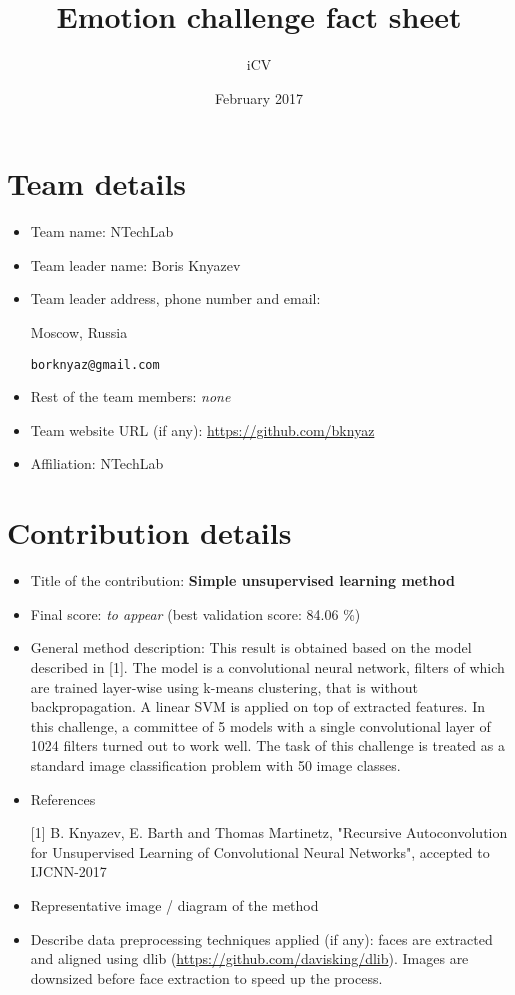 \documentclass{article}
\title{Emotion challenge fact sheet}
\author{iCV}
\date{February 2017}
\begin{document}
\maketitle

\section{Team details}

\begin{itemize}
\item Team name: NTechLab                                  
\item Team leader name: Boris Knyazev                           
\item Team leader address, phone number and email: 

Moscow, Russia

\texttt{borknyaz@gmail.com}

\item Rest of the team members: \textit{none}                    
\item Team website URL (if any): \url{https://github.com/bknyaz}
\item Affiliation: NTechLab
\end{itemize}

\section{Contribution details}

\begin{itemize}
\item Title of the contribution: \textbf{Simple unsupervised learning method}
\item Final score: \textit{to appear} (best validation score: 84.06 \%)                                             
\item General method description: This result is obtained based on the model described in [1]. 
The model is a convolutional neural network, filters of which are trained layer-wise using k-means clustering, that is without backpropagation. 
A linear SVM is applied on top of extracted features. In this challenge, a committee of 5 models with a single convolutional layer of 1024 filters turned out to work well.
The task of this challenge is treated as a standard image classification problem with 50 image classes.

\item References

[1] B. Knyazev, E. Barth and Thomas Martinetz, "Recursive Autoconvolution for Unsupervised Learning of Convolutional Neural Networks", accepted to IJCNN-2017
\item Representative image / diagram of the method        
\item Describe data preprocessing techniques applied (if any): 
faces are extracted and aligned using dlib (\url{https://github.com/davisking/dlib}). 
Images are downsized before face extraction to speed up the process.
\end{itemize}
\end{document}
